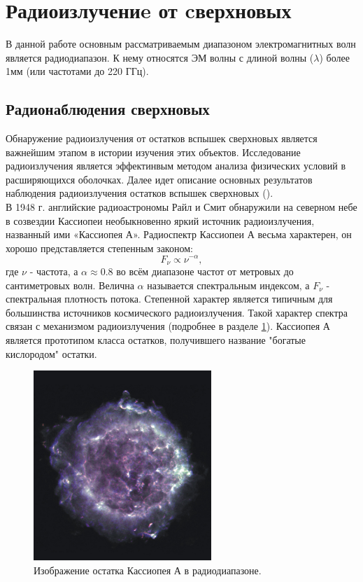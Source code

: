 \documentclass[a4paper,12pt]{extarticle}
\begin{document}
\section{Радиоизлучениe от cверхновых} \label{sec: Radio emission}
\hspace{1cm} В данной работе основным рассматриваемым диапазоном электромагнитных волн является радиодиапазон.
К нему относятся ЭМ волны с длиной волны ($\lambda$) более 1мм (или частотами до 220 ГГц).




\subsection{Радионаблюдения сверхновых}
Обнаружение радиоизлучения от остатков вспышек сверхновых является важнейшим этапом в истории изучения этих объектов. Исследование радиоизлучения является эффектинвым методом анализа физических условий в расширяющихся оболочках. Далее идет описание основных результатов наблюдения радиоизлучения остатков вспышек сверхновых (\cite{Shklov1984}).\\
\indent В 1948 г. английские радиоастрономы Райл и Смит обнаружили на северном небе в созвездии Кассиопеи необыкновенно яркий источник радиоизлучения, названный ими «Кассиопея А». 
Радиоспектр Кассиопеи А весьма характерен, он хорошо представляется степенным законом:
$$ F_\nu \propto \nu^{-\alpha},$$
где $\nu$ - частота, а $\alpha \approx 0.8$ во всём диапазоне частот от метровых до сантиметровых волн. Велична $\alpha $ называется спектральным индексом, а $F_\nu$ - спектральная плотность потока. Степенной характер является типичным для большинства источников космического радиоизлучения. Такой характер спектра связан с механизмом радиоизлучения (подробнее в разделе \ref{sec: Radio emission}). 
Кассиопея А является прототипом класса остатков, получившего название "богатые кислородом" остатки. 

\begin{figure}[!htb] 
	\centering
	\includegraphics[width=0.6\textwidth]{CassA_2002_large-1_Radio.jpg}
	\caption{
		Изображение остатка Кассиопея А в радиодиапазоне.
	}
	\label{fig:Cas A Radio}
\end{figure}
\end{document}
